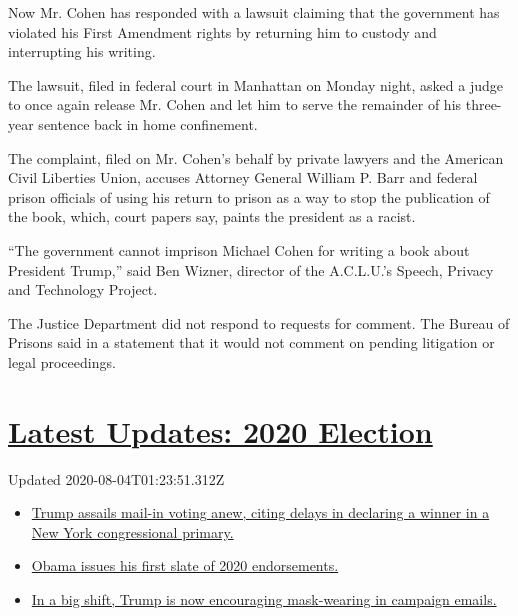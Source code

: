 Now Mr. Cohen has responded with a lawsuit claiming that the government
has violated his First Amendment rights by returning him to custody and
interrupting his writing.

The lawsuit, filed in federal court in Manhattan on Monday night, asked
a judge to once again release Mr. Cohen and let him to serve the
remainder of his three-year sentence back in home confinement.

The complaint, filed on Mr. Cohen's behalf by private lawyers and the
American Civil Liberties Union, accuses Attorney General William P. Barr
and federal prison officials of using his return to prison as a way to
stop the publication of the book, which, court papers say, paints the
president as a racist.

``The government cannot imprison Michael Cohen for writing a book about
President Trump,'' said Ben Wizner, director of the A.C.L.U.'s Speech,
Privacy and Technology Project.

The Justice Department did not respond to requests for comment. The
Bureau of Prisons said in a statement that it would not comment on
pending litigation or legal proceedings.

\hypertarget{latest-updates-2020-election}{%
\section{\texorpdfstring{\href{https://www.nytimes.com/2020/08/03/us/elections/biden-vs-trump.html?action=click\&pgtype=Article\&state=default\&region=MAIN_CONTENT_1\&context=storylines_live_updates}{Latest
Updates: 2020
Election}}{Latest Updates: 2020 Election}}\label{latest-updates-2020-election}}

Updated 2020-08-04T01:23:51.312Z

\begin{itemize}
\tightlist
\item
  \href{https://www.nytimes.com/2020/08/03/us/elections/biden-vs-trump.html?action=click\&pgtype=Article\&state=default\&region=MAIN_CONTENT_1\&context=storylines_live_updates\#link-6494b448}{Trump
  assails mail-in voting anew, citing delays in declaring a winner in a
  New York congressional primary.}
\item
  \href{https://www.nytimes.com/2020/08/03/us/elections/biden-vs-trump.html?action=click\&pgtype=Article\&state=default\&region=MAIN_CONTENT_1\&context=storylines_live_updates\#link-3de249e6}{Obama
  issues his first slate of 2020 endorsements.}
\item
  \href{https://www.nytimes.com/2020/08/03/us/elections/biden-vs-trump.html?action=click\&pgtype=Article\&state=default\&region=MAIN_CONTENT_1\&context=storylines_live_updates\#link-54e34d20}{In
  a big shift, Trump is now encouraging mask-wearing in campaign
  emails.}
\end{itemize}

